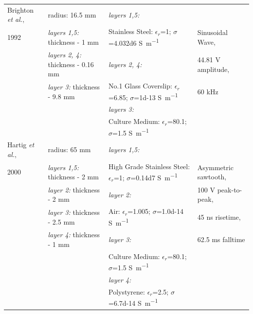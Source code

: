 \begin{table}[p]
\begin{tabularx}{\textwidth}{l l l l}
Brighton \textit{et al.},  & radius: 16.5 \si{\milli\meter} & \textit{layers 1,5:}  & \\
1992 \cite{Brighton1992-gg} & \textit{layers 1,5:} thickness - 1 \si{\milli\meter} & Stainless Steel: $\epsilon_{r}$=1; $\sigma$=\num{4.032d6} \si{\siemens\per\meter} & Sinusoidal Wave, \\
& \textit{layers 2, 4:} thickness - 0.16 \si{\milli\meter} & \textit{layers 2, 4:} & 44.81 \si{\volt} amplitude,\\
& \textit{layer 3:} thickness - 9.8 \si{\milli\meter} & No.1 Glass Coverslip: $\epsilon_{r}$=6.85; $\sigma$=\num{1d-13} \si{\siemens\per\meter} \cite{Hench1972-el} & 60 \si{\kilo\hertz} \\
&  & \textit{layers 3:} & \\
&  & Culture Medium: $\epsilon_{r}$=80.1; $\sigma$=1.5 \si{\siemens\per\meter} \cite{Visone2018-sa} & \\ \cmidrule(l){1-4}
 

Hartig \textit{et al.}, & radius: 65 \si{\milli\meter} & \textit{layers 1,5:} & \\
2000 \cite{Hartig2000-ny} & \textit{layers 1,5:} thickness - 2 \si{\milli\meter} & High Grade Stainless Steel: $\epsilon_{r}$=1; $\sigma$=\num{0.14d7} \si{\siemens\per\meter} & Asymmetric sawtooth, \\
& \textit{layer 2:} thickness - 2 \si{\milli\meter} & \textit{layer 2:} & 100 \si{\volt} peak-to-peak, 	\\
& \textit{layer 3:} thickness - 2.5 \si{\milli\meter} & Air: $\epsilon_{r}$=1.005;  $\sigma$=\num{1.0d-14} \si{\siemens\per\meter} \cite{Seran2017-qg} & 45 \si{\nano\second} risetime, \\
& \textit{layer 4:} thickness - 1 \si{\milli\meter} & \textit{layer 3:} & 62.5 \si{\milli\second} falltime	\\
& & Culture Medium: $\epsilon_{r}$=80.1;  $\sigma$=1.5 \si{\siemens\per\meter} \cite{Visone2018-sa} & \\
& & \textit{layer 4:} & \\
&  & Polystyrene: $\epsilon_{r}$=2.5;  $\sigma$=\num{6.7d-14} \si{\siemens\per\meter} \cite{Qi2011-se} & \\ \cmidrule(l){1-4}



\end{tabularx}
\end{table}
